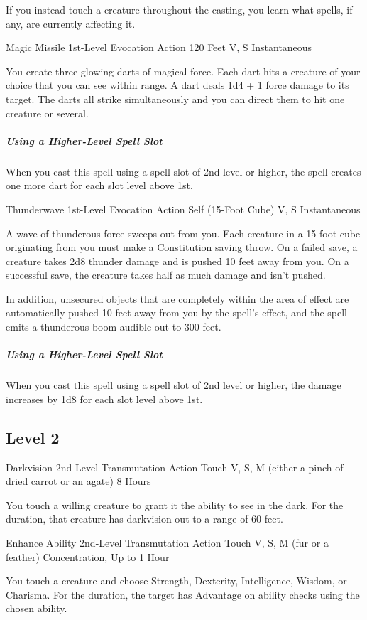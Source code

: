 \documentclass[letterpaper,openany,oneside,twocolumn]{book}
\begin{document}
If you instead touch a creature throughout the casting, you learn what spells, if any, are currently affecting it.

\DndSpellHeader
  {Magic Missile}
  {1st-Level Evocation}
  {Action}
  {120 Feet}
  {V, S}
  {Instantaneous}

You create three glowing darts of magical force. Each dart hits a creature of your choice that you can see within range. A dart deals 1d4 + 1 force damage to its target. The darts all strike simultaneously and you can direct them to hit one creature or several.

\subparagraph*{Using a Higher-Level Spell Slot} When you cast this spell using a spell slot of 2nd level or higher, the spell creates one more dart for each slot level above 1st.

\DndSpellHeader
  {Thunderwave}
  {1st-Level Evocation}
  {Action}
  {Self (15-Foot Cube)}
  {V, S}
  {Instantaneous}

A wave of thunderous force sweeps out from you. Each creature in a 15-foot cube originating from you must make a Constitution saving throw. On a failed save, a creature takes 2d8 thunder damage and is pushed 10 feet away from you. On a successful save, the creature takes half as much damage and isn't pushed.

In addition, unsecured objects that are completely within the area of effect are automatically pushed 10 feet away from you by the spell’s effect, and the spell emits a thunderous boom audible out to 300 feet.

\subparagraph*{Using a Higher-Level Spell Slot} When you cast this spell using a spell slot of 2nd level or higher, the damage increases by 1d8 for each slot level above 1st.

\subsection*{Level 2}

\DndSpellHeader
  {Darkvision}
  {2nd-Level Transmutation}
  {Action}
  {Touch}
  {V, S, M (either a pinch of dried carrot or an agate)}
  {8 Hours}

You touch a willing creature to grant it the ability to see in the dark. For the duration, that creature has darkvision out to a range of 60 feet.

\DndSpellHeader
  {Enhance Ability}
  {2nd-Level Transmutation}
  {Action}
  {Touch}
  {V, S, M (fur or a feather)}
  {Concentration, Up to 1 Hour}

You touch a creature and choose Strength, Dexterity, Intelligence, Wisdom, or Charisma. For the duration, the target has Advantage on ability checks using the chosen ability.
\end{document}
